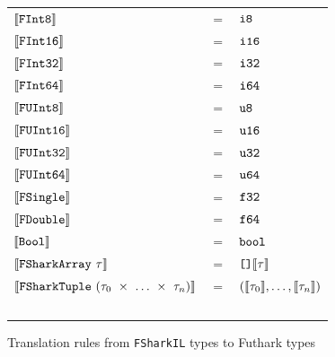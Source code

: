 \begin{figure}
  \centering
\begin{tabular}{@{}l c l}%
  $\evals{\lit{FInt8}}$ & $=$ & $\lit{i8} $ \\ 
  $\evals{\lit{FInt16}}$ & $=$ & $\lit{i16}$
  \\              
  $\evals{\lit{FInt32}}$ & $=$ & $\lit{i32} $ \\ 
  $\evals{\lit{FInt64}}$ & $=$ & $\lit{i64} $
  \\
  $\evals{\lit{FUInt8}}$ & $=$ & $\lit{u8} $ \\ 
  $\evals{\lit{FUInt16}}$ & $=$ & $\lit{u16} $ 
  \\               
  $\evals{\lit{FUInt32}}$ & $=$ & $\lit{u32} $ \\ 
  $\evals{\lit{FUInt64}}$ & $=$ & $\lit{u64} $ 
  \\
  $\evals{\lit{FSingle}}$ & $=$ & $\lit{f32} $ \\ 
  $\evals{\lit{FDouble}}$ & $=$ & $\lit{f64} $ \\
  $\evals{\lit{Bool}}$ & $=$ & $\lit{bool} $ \\ 
  $\evals{\lit{FSharkArray}~\tau}$ & $=$ & $\lit{[]}\evals{\tau}$
  \\
  $\evals{\lit{\fshark{}Tuple}~({\tau_0}~\times~\ldots~\times~{\tau_n})}$ & $=$ & $(\evals{\tau_0},\ldots,\evals{\tau_n})$ \\ ~ \\
\end{tabular}
\caption{Translation rules from \texttt{FSharkIL} types to Futhark types}
\label{fig:fsharkiltofutharktypes}
\end{figure}

